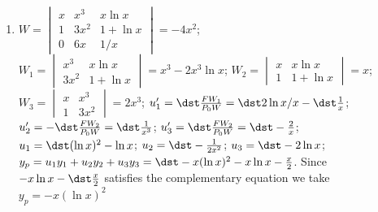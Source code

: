 \documentclass[openany]{book}
\newenvironment{sectionSolutions}{
 \begin{enumerate}[item-label={\thesection.\arabic{enumi}.}]
}{
 \end{enumerate}
}
\begin{document}
\begin{sectionSolutions}
$W_2=\begin{vmatrix}
e^x&\dst\frac{e^x}{ x}&\dst\frac{e^{2x}}{ x}\\
e^x&\dst\frac{e^x(x-1)}{ x^2}&\dst\frac{e^{2x}(2x-1)}{ x^2}\\
e^x&\dst\frac{e^x(x^2-2x+2)}{ x^3}&\dst\frac{2e^{2x}(2x^2-2x+1)}{ x^3}
\end{vmatrix}=-\dst\frac{e^{4x}}{ x^3}$;

$W_3=\begin{vmatrix}
e^x&e^{2x}&\dst\frac{e^{2x}}{ x}\\
e^x&2e^{2x}&\dst\frac{e^{2x}(2x-1)}{ x^2}\\
e^x&4e^{2x}&\dst\frac{2e^{2x}(2x^2-2x+1)}{ x^3}
\end{vmatrix}=\dst\frac{e^{5x}(2-x)}{ x^3}$;

$W_4=\begin{vmatrix}
e^x&e^{2x}&\dst\frac{e^x}{ x}\\
e^x&2e^{2x}&\dst\frac{e^x(x-1)}{ x^2}\\
e^x&4e^{2x}&\dst\frac{e^x(x^2-2x+2)}{ x^3}
\end{vmatrix}=\dst\frac{e^{4x}(x+2)}{ x^3}$;

$u_1'=-\dst\frac{FW_1}{ P_0W}=\dst3$;
$u_2'=\dst\frac{FW_2}{ P_0W}=\dst3e^{-x}$;
$u_3'=-\dst\frac{FW_2}{ P_0W}=\dst3(2-x)$;
$u_4'=\dst\frac{FW_4}{ P_0W}=\dst-3e^{-x}(x+2)$;
$u_1=\dst 3x$;
$u_2=\dst-3e^{-x}$;
$u_3=\dst3x(4-x)/2$;
$u_4=\dst3e^{-x}(x+3)$;
$y_p=u_1y_1+u_2y_2+u_3y_3=\dst\frac{3e^x(x^2+4x+6)}{ 2x}$.
Since
$\dst\frac{3e^x(2x+3)}{ x}$ is a solution of the complementary
equation we take $y_p=\dst\frac{3xe^x}{2}$.





\item
$W=\begin{vmatrix}
x&x^3&x\ln x\\1&3x^2&1+\ln x\\0&6x&1/x
\end{vmatrix}=-4x^2$;
$W_1=\begin{vmatrix}
x^3&x\ln x\\3x^2&1+\ln x
\end{vmatrix}=x^3-2x^3\ln x$;
$W_2=\begin{vmatrix}
x&x\ln x\\1&1+\ln x\end{vmatrix}=x$;
$W_3=\begin{vmatrix}x&x^3\\1&3x^2
\end{vmatrix}=2x^3$;
$u_1'=\dst\frac{FW_1}{ P_0W}=\dst2\ln x/x-\dst\frac{1}{ x}$;
$u_2'=-\dst\frac{FW_2}{ P_0W}=\dst\frac{1}{ x^3}$;
$u_3'=\dst\frac{FW_2}{ P_0W}=\dst-\frac{2}{ x}$;
$u_1=\dst(\ln x)^2-\ln x$;
$u_2=\dst-\frac{1}{ 2x^2}$;
$u_3=\dst-2\ln x$;
$y_p=u_1y_1+u_2y_2+u_3y_3=\dst-x(\ln x)^2-x\ln x-\frac{x}{ 2}$.
Since $-x\ln x-\dst\frac{x}{ 2}$ satisfies the complementary equation
we take $y_p=-x(\ln x)^2$



\end{sectionSolutions}
\end{document}
